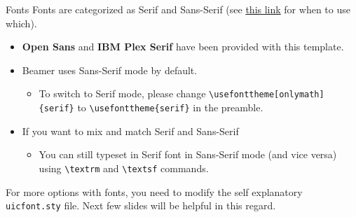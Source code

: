 \documentclass{beamer}
\newcommand{\hrefcol}[2]{\textcolor{uihteal}{\href{#1}{#2}}}
\begin{document}
\begin{frame}[fragile]{Fonts}
Fonts are categorized as \textrm{Serif} and \textsf{Sans-Serif} (see \hrefcol{https://www.adobe.com/creativecloud/design/discover/serif-vs-sans-serif.html}{this link} for when to use which).

\begin{itemize}
    \item \textbf{\textsf{Open Sans}} and \textbf{\textrm{IBM Plex Serif}} have been provided with this template.
    \item Beamer uses \textsf{Sans-Serif} mode by default.
    \begin{itemize}
        \item To switch to Serif mode, please change \verb|\usefonttheme[onlymath]{serif}| to \verb|\usefonttheme{serif}| in the preamble.
    \end{itemize}
    \item If you want to mix and match Serif and Sans-Serif
    \begin{itemize}
        \item You can still typeset in Serif font in Sans-Serif mode (and vice versa) using \verb|\textrm| and \verb|\textsf| commands.
    \end{itemize}
\end{itemize}
For more options with fonts, you need to modify the self explanatory \verb|uicfont.sty| file. Next few slides will be helpful in this regard.
\end{frame}
\end{document}
